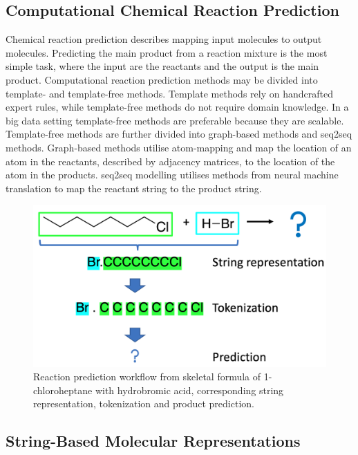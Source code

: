 \documentclass[10pt,conference,compsocconf]{IEEEtran}
\begin{document}
\subsection{Computational Chemical Reaction Prediction}

Chemical reaction prediction describes mapping input molecules to output molecules\cite{ReactionPredictionReview}. Predicting the main product from a reaction mixture is the most simple task, where the input are the reactants and the output is the main product. Computational reaction prediction methods may be divided into template- and template-free methods\cite{MolecularTransformer,SELFIES}. Template methods rely on handcrafted expert rules, while template-free methods do not require domain knowledge. In a big data setting template-free methods are preferable because they are scalable. Template-free methods are further divided into graph-based methods and seq2seq methods. Graph-based methods utilise atom-mapping and map the location of an atom in the reactants, described by adjacency matrices, to the location of the atom in the products. seq2seq modelling utilises methods from neural machine translation to map the reactant string to the product string. 

\begin{figure}[t!]
    \centering
    \includegraphics[width = .9\linewidth]{./figures/reaction_prediction.png}
    \caption{Reaction prediction workflow from skeletal formula of 1-chloroheptane with hydrobromic acid, corresponding string representation, tokenization and product prediction. }
    \label{fig:chemical_prediction_example}
\end{figure} 

\subsection{String-Based Molecular Representations}
\end{document}
